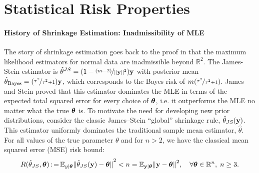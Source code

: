\documentclass[11pt]{article}
\begin{document}
\section{Statistical Risk Properties}\label{sec:stat-prop}

\paragraph{History of Shrinkage Estimation: Inadmissibility of MLE } The story of shrinkage estimation goes back to the proof in \citet{stein_inadmissibility_1956} that the maximum likelihood estimators for normal data are inadmissible beyond $\mathbb{R}^2$. The James-Stein estimator is $\hat{\theta}^{JS} = (1 - \nicefrac{(m-2)}{\left|\left|{\bf y}\right|\right|^2}){\bf y}$ with posterior mean $\hat{\theta}_{\mathrm{Bayes}} = (\nicefrac{\tau^2}{\tau^2+1}) {\bf y}$, which corresponds to the Bayes risk of $m(\nicefrac{\tau^2}{\tau^2+1})$. %
James and Stein proved that this estimator dominates the MLE in terms of the expected total squared error for every choice of $\boldsymbol{\theta}$, i.e. it outperforms the MLE no matter what the true $\boldsymbol{\theta}$ is. To motivate the need for developing new prior distributions, consider the classic James--Stein ``global'' shrinkage rule, ${\hat{\theta}}_{JS}{}({\bf y})$. This estimator uniformly dominates the traditional sample mean estimator, $\hat{\theta}$. For all values of the true parameter $\theta$ and for $n>2$, we have the classical mean squared error (MSE) risk bound:
\[
R({\hat{\theta}}_{JS}{}, \boldsymbol{\theta}) \operatorname{:=} \mathbb E_{y \mid \boldsymbol{\theta}} {\Vert {\hat{\theta}}_{JS}{}({\bf y}) - \boldsymbol{\theta} \Vert}^2 < n = \mathbb E_{{\bf y} \mid \boldsymbol{\theta}} {\Vert {\bf y} - \boldsymbol{\theta} \Vert}^2, \quad \forall \boldsymbol{\theta} \in \mathbb{R}^n, \; n \ge 3.
\]
\end{document}
